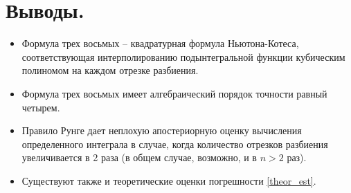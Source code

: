 \documentclass[a4paper, 12pt]{article}
\begin{document}
	\section{Выводы.}
	
	\begin{itemize}
		\item Формула трех восьмых -- квадратурная формула Ньютона-Котеса, соответствующая интерполированию подынтегральной функции кубическим полиномом на каждом отрезке разбиения.
		\item Формула трех восьмых имеет алгебраический порядок точности равный четырем.
		\item Правило Рунге дает неплохую апостериорную оценку вычисления определенного интеграла в случае, когда количество отрезков разбиения увеличивается в 2 раза (в общем случае, возможно, и в $n>2$ раз).
		\item Существуют также и теоретические оценки погрешности \eqref{theor_est}.
	\end{itemize}
	
\end{document}
